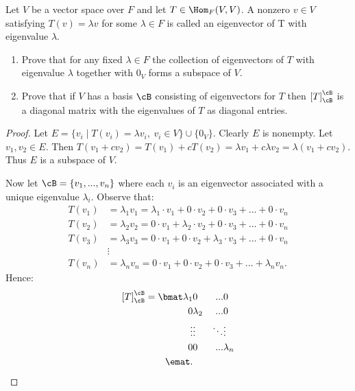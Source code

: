 \documentclass[10pt,twoside,openany]{memoir}
\begin{document}
    \begin{exercise}
        Let $V$ be a vector space over $F$ and let $T \in \Hom_F{(V,V)}$. A nonzero $v \in V$ satisfying $T(v) = \lambda v$ for some $\lambda \in F$ is called an eigenvector of T with eigenvalue $\lambda$.
            \begin{enumerate}[label = (\alph*)]
                \item Prove that for any fixed $\lambda \in F$ the collection of eigenvectors of $T$ with eigenvalue $\lambda$ together with $0_V$ forms a subspace of $V$.
                \item Prove that if $V$ has a basis $\cB$ consisting of eigenvectors for $T$ then $\left[T\right]_\cB ^\cB$ is a diagonal matrix with the eigenvalues of $T$ as diagonal entries.
            \end{enumerate}
    \end{exercise}
        \begin{proof}
            Let $E = \{v_i \mid T(v_i) = \lambda v_i,\hspace{3pt} v_i \in V\} \cup \{0_V\}$. Clearly $E$ is nonempty. Let $v_1 ,v_2 \in E$. Then $T(v_1 + cv_2) = T(v_1) + cT(v_2) = \lambda v_1 + c \lambda v_2 = \lambda(v_1 + c v_2)$. Thus $E$ is a subspace of $V$.

            Now let $\cB = \{v_1,...,v_n\}$ where each $v_i$ is an eigenvector associated with a unique eigenvalue $\lambda_i$. Observe that:
                \begin{equation*}
                \begin{split}
                    T(v_1) & = \lambda_1 v_1 = \lambda_1 \cdot v_1 + 0 \cdot v_2 + 0 \cdot v_3 + ... + 0 \cdot v_n \\
                    T(v_2) & = \lambda_2 v_2 = 0 \cdot v_1 + \lambda_2 \cdot v_2 + 0 \cdot v_3 + ... + 0 \cdot v_n \\
                    T(v_3) & = \lambda_3 v_3 = 0 \cdot v_1 + 0 \cdot v_2 + \lambda_3 \cdot v_3  + ... + 0 \cdot v_n \\
                    &\vdots \\
                    T(v_n) & = \lambda_n v_n = 0 \cdot v_1 + 0 \cdot v_2 + 0 \cdot v_3 + ... + \lambda_n v_n.
                \end{split}
                \end{equation*}
            Hence:
                \begin{equation*}
                \begin{split}
                    \left[T\right]_\cB^\cB =
                    \bmat 
                    \lambda_1 & 0 & ... & 0   \\
                    0 & \lambda_2 &  ... &  0  \\
                    \vdots &  \vdots & \ddots & \vdots \\
                    0 & 0& ... & \lambda_n   \\
                    \emat.
                \end{split}
                \end{equation*}
        \end{proof}
\end{document}
